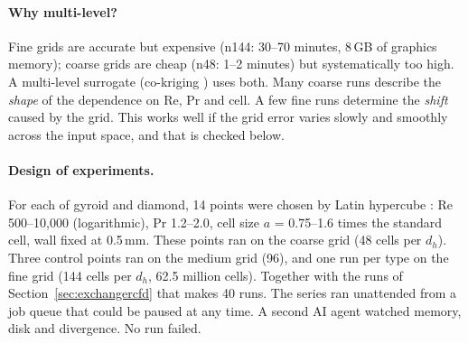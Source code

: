 \paragraph{Why multi-level?} Fine grids are accurate but expensive (n144: 30--70 minutes, 8\,GB of graphics memory);
coarse grids are cheap (n48: 1--2 minutes) but systematically too high. A multi-level surrogate (co-kriging
\cite{kennedy2000}) uses both. Many coarse runs describe the \emph{shape} of the dependence on Re, Pr and cell. A few
fine runs determine the \emph{shift} caused by the grid. This works well if the grid error varies slowly and smoothly
across the input space, and that is checked below.

\paragraph{Design of experiments.} For each of gyroid and diamond, 14 points were chosen by Latin hypercube
\cite{mckay1979}: Re 500--10,000 (logarithmic), Pr 1.2--2.0, cell size $a$ = 0.75--1.6 times the standard cell, wall
fixed at 0.5\,mm. These points ran on the coarse grid (48 cells per $d_h$). Three control points ran on the medium grid
(96), and one run per type on the fine grid (144 cells per $d_h$, 62.5 million cells). Together with the runs of
Section~\ref{sec:exchangercfd} that makes 40 runs. The series ran unattended from a job queue that could be paused at any
time. A second AI agent watched memory, disk and divergence. No run failed.

